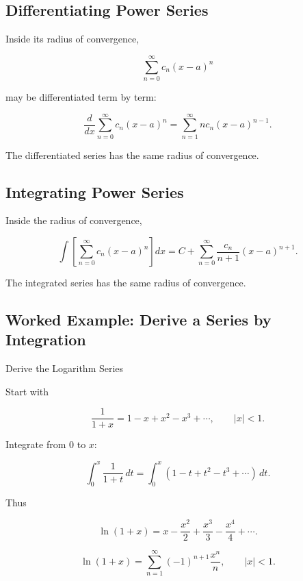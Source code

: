 \subsection{Differentiating Power Series}
\label{subsec:differentiate-power-series-reference}

Inside its radius of convergence,

\[
\sum_{n=0}^{\infty}
c_n(x-a)^n
\]

may be differentiated term by term:

\[
\boxed{
\frac{d}{dx}
\sum_{n=0}^{\infty}
c_n(x-a)^n
=
\sum_{n=1}^{\infty}
nc_n(x-a)^{n-1}.
}
\]

The differentiated series has the same radius of convergence.

\subsection{Integrating Power Series}
\label{subsec:integrate-power-series-reference}

Inside the radius of convergence,

\[
\boxed{
\int
\left[
\sum_{n=0}^{\infty}
c_n(x-a)^n
\right]
dx
=
C
+
\sum_{n=0}^{\infty}
\frac{
c_n
}{
n+1
}
(x-a)^{n+1}.
}
\]

The integrated series has the same radius of convergence.

\subsection{Worked Example: Derive a Series by Integration}
\label{subsec:worked-series-integration}

\begin{workedexamplebox}{Derive the Logarithm Series}

Start with

\[
\frac{1}{1+x}
=
1-x+x^2-x^3+\cdots,
\qquad
|x|<1.
\]

Integrate from \(0\) to \(x\):

\[
\int_0^x
\frac{1}{1+t}
\,dt
=
\int_0^x
(1-t+t^2-t^3+\cdots)
\,dt.
\]

Thus

\[
\ln(1+x)
=
x-\frac{x^2}{2}
+\frac{x^3}{3}
-\frac{x^4}{4}
+\cdots.
\]

\begin{answerbox}
\[
\boxed{
\ln(1+x)
=
\sum_{n=1}^{\infty}
(-1)^{n+1}
\frac{x^n}{n},
\qquad
|x|<1.
}
\]
\end{answerbox}

\end{workedexamplebox}

